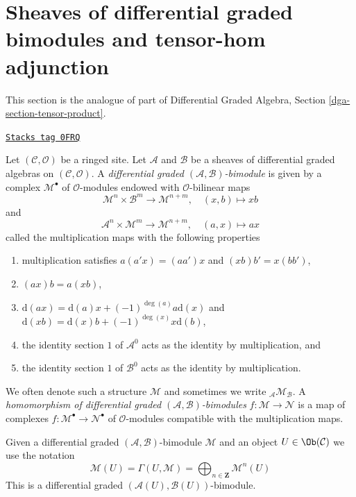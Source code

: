 \section{Sheaves of differential graded bimodules and tensor-hom adjunction}
\label{sdga-section-dg-bimodules}
This section is the analogue of part of
Differential Graded Algebra, Section \ref{dga-section-tensor-product}.

\begin{definition}[Dg bimodule]
\label{sdga-definition-dg-bimodule}
\href{https://stacks.math.columbia.edu/tag/0FRQ}{\texttt{Stacks tag 0FRQ}}

Let $(\mathcal{C}, \mathcal{O})$ be a ringed site. Let $\mathcal{A}$
and $\mathcal{B}$ be a sheaves of differential graded algebras on
$(\mathcal{C}, \mathcal{O})$. A
{\it differential graded $(\mathcal{A}, \mathcal{B})$-bimodule}
is given by a complex $\mathcal{M}^\bullet$
of $\mathcal{O}$-modules endowed with $\mathcal{O}$-bilinear maps
$$
\mathcal{M}^n \times \mathcal{B}^m \to \mathcal{M}^{n + m},\quad
(x, b) \longmapsto xb
$$
and
$$
\mathcal{A}^n \times \mathcal{M}^m \to \mathcal{M}^{n + m},\quad
(a, x) \longmapsto ax
$$
called the multiplication maps with the following properties
\begin{enumerate}
\item multiplication satisfies $a(a'x) = (aa')x$ and
$(xb)b' = x(bb')$,
\item $(ax)b = a(xb)$,
\item $\text{d}(ax) = \text{d}(a) x + (-1)^{\deg(a)}a \text{d}(x)$ and
$\text{d}(xb) = \text{d}(x) b + (-1)^{\deg(x)}x \text{d}(b)$,
\item the identity section $1$ of $\mathcal{A}^0$ acts as the
identity by multiplication, and
\item the identity section $1$ of
$\mathcal{B}^0$ acts as the identity by multiplication.
\end{enumerate}
We often denote such a structure $\mathcal{M}$ and sometimes
we write ${}_\mathcal{A}\mathcal{M}_\mathcal{B}$.
A {\it homomorphism of differential graded
$(\mathcal{A}, \mathcal{B})$-bimodules}
$f : \mathcal{M} \to \mathcal{N}$ is a map of complexes
$f : \mathcal{M}^\bullet \to \mathcal{N}^\bullet$
of $\mathcal{O}$-modules compatible with the multiplication maps.
\end{definition}

Given a differential graded $(\mathcal{A}, \mathcal{B})$-bimodule $\mathcal{M}$
and an object $U \in \Ob(\mathcal{C})$ we use the notation
$$
\mathcal{M}(U) =
\Gamma(U, \mathcal{M}) =
\bigoplus\nolimits_{n \in \mathbf{Z}} \mathcal{M}^n(U)
$$
This is a differential graded $(\mathcal{A}(U), \mathcal{B}(U))$-bimodule.

